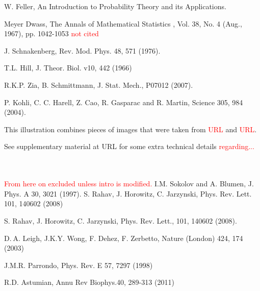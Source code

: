 \documentclass[aps,prl,floats,floatfix,twocolumn]{revtex4}
\newcommand{\rmrk}[1]{\textcolor{red}{#1}}
\begin{document}
\begin{thebibliography}{99}
W. Feller, 
An Introduction to Probability Theory and its Applications.

Meyer Dwass,
The Annals of Mathematical Statistics , Vol. 38, No. 4 (Aug., 1967), pp. 1042-1053
\rmrk{not cited}



J. Schnakenberg,
Rev. Mod. Phys. 48, 571 (1976).

T.L. Hill, 
J. Theor. Biol. v10, 442 (1966)

R.K.P. Zia, B. Schmittmann, 
J. Stat. Mech., P07012 (2007).

P. Kohli, C. C. Harell, Z. Cao, R. Gasparac and R. Martin, Science 305, 984 (2004).




This illustration combines pieces of images 
that were taken from \rmrk{URL} and \rmrk{URL}.

See supplementary material at URL for some extra technical details \rmrk{regarding...}


\ \\ \ \\ 


\rmrk{From here on excluded unless intro is modified.}
I.M. Sokolov and A. Blumen, J. Phys. A 30, 3021 (1997). 
S. Rahav, J. Horowitz, C. Jarzynski,
Phys. Rev. Lett. 101, 140602 (2008)

S. Rahav, J. Horowitz, C. Jarzynski,
Phys. Rev. Lett., 101, 140602 (2008).

D. A. Leigh,  J.K.Y. Wong, F. Dehez, F. Zerbetto,
Nature (London) 424, 174 (2003)

J.M.R. Parrondo,
Phys. Rev. E 57, 7297 (1998)

R.D. Astumian,
Annu Rev Biophys.40, 289-313 (2011)


\end{thebibliography}
\end{document}
